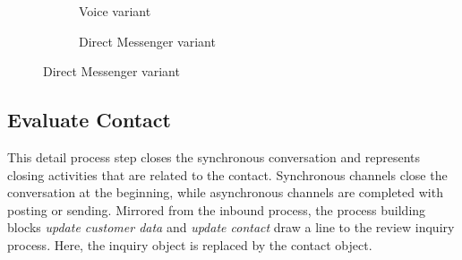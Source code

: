 \begin{figure}[caption={Contact customer detail process}, label={fig:outbound:con}]
\begin{subfigure}[b]{.45\textwidth}
\begin{tikzpicture}
			\end{tikzpicture}
			\caption{Voice variant}\label{fig:outbound:con:voice}
		\end{subfigure}
		\begin{subfigure}[b]{.45\textwidth}
			\centering	
			\caption{Direct Messenger variant}\label{fig:outbound:con:dm}
		\end{subfigure}
	\end{figure}



		\subsection{Evaluate Contact}
		
		This detail process step closes the synchronous conversation and represents closing activities that are related to the contact. Synchronous channels close the conversation at the beginning, while asynchronous channels are completed with posting or sending. Mirrored from the inbound process, the process building blocks \textit{update customer data} and \textit{update contact} draw a line to the review inquiry process. Here, the inquiry object is replaced by the contact object. 

